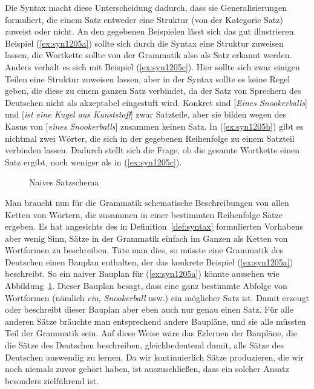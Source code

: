 Die Syntax macht diese Unterscheidung dadurch, dass sie Generalisierungen formuliert, die einem Satz entweder eine Struktur (von der Kategorie Satz) zuweist oder nicht.
An den gegebenen Beispielen lässt sich das gut illustrieren.
Beispiel (\ref{ex:syn1205a}) sollte sich durch die Syntax eine Struktur zuweisen lassen, die Wortkette sollte von der Grammatik also als Satz erkannt werden.
Anders verhält es sich mit Beispiel (\ref{ex:syn1205c}).
Hier sollte sich zwar einigen Teilen eine Struktur zuweisen lassen, aber in der Syntax sollte es keine Regel geben, die diese zu einem ganzen Satz verbindet, da der Satz von Sprechern des Deutschen \idR nicht als akzeptabel eingestuft wird.
Konkret sind [\textit{Eines Snookerballs}] und [\textit{ist eine Kugel aus Kunststoff}] zwar Satzteile, aber sie bilden wegen des Kasus von [\textit{eines Snookerballs}] zusammen keinen Satz.
In (\ref{ex:syn1205b}) gibt es nichtmal zwei Wörter, die sich in der gegebenen Reihenfolge zu einem Satzteil verbinden lassen.
Dadurch stellt sich die Frage, ob die gesamte Wortkette einen Satz ergibt, noch weniger als in (\ref{ex:syn1205c}).

\begin{figure}
  \centering
  \caption{Naives Satzschema}
  \label{fig:satzschema1}
\end{figure}

Man braucht nun für die Grammatik schematische Beschreibungen von allen Ketten von Wörtern, die zusammen in einer bestimmten Reihenfolge Sätze ergeben.
Es hat angesichts des in Definition~\ref{def:syntax} formulierten Vorhabens aber wenig Sinn, Sätze in der Grammatik einfach im Ganzen als Ketten von Wortformen zu beschreiben.
Täte man dies, so müsste eine Grammatik des Deutschen einen Bauplan enthalten, der das konkrete Beispiel (\ref{ex:syn1205a}) beschreibt.
So ein naiver Bauplan für (\ref{ex:syn1205a}) könnte aussehen wie Abbildung~\ref{fig:satzschema1}.
Dieser Bauplan besagt, dass eine ganz bestimmte Abfolge von Wortformen (nämlich \textit{ein}, \textit{Snookerball} usw.) ein möglicher Satz ist.
Damit erzeugt oder beschreibt dieser Bauplan aber eben auch nur genau einen Satz.
Für alle anderen Sätze bräuchte man entsprechend andere Baupläne, und sie alle müssten Teil der Grammatik sein.
Auf diese Weise wäre das Erlernen der Baupläne, die die Sätze des Deutschen beschreiben, gleichbedeutend damit, alle Sätze des Deutschen auswendig zu lernen.
Da wir kontinuierlich Sätze produzieren, die wir noch niemals zuvor gehört haben, ist auszuschließen, dass ein solcher Ansatz besonders zielführend ist.

